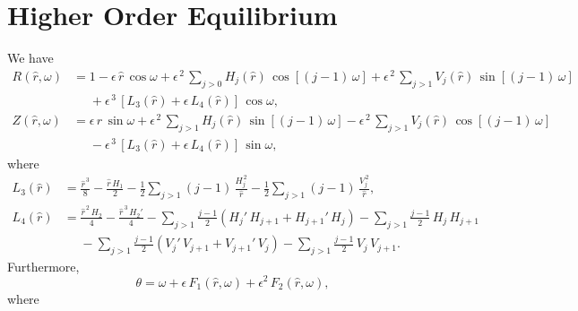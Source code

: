 \documentclass[12pt,prb,aps]{revtex4-1}
\begin{document}
\section{Higher Order Equilibrium}
We have 
\begin{align}
R(\hat{r},\omega) &= 1 -\epsilon\,\hat{r}\,\cos\omega + \epsilon^{\,2}\,\sum_{j>0}H_j(\hat{r})\,\cos[(j-1)\,\omega] + \epsilon^{\,2}\,\sum_{j>1}V_j(\hat{r})\,\sin[(j-1)\,\omega] \nonumber\\[0.5ex]
&\phantom{=}+\epsilon^{\,3}\,[L_3(\hat{r})+\epsilon\,L_4(\hat{r})]\,\cos\omega,\\[0.5ex]
Z(\hat{r},\omega)&= \epsilon\,\hat{r}\,\sin\omega +\epsilon^{\,2}\,\sum_{j>1}H_j(\hat{r})\,\sin[(j-1)\,\omega]
-\epsilon^{\,2}\,\sum_{j>1}V_j(\hat{r})\,\cos[(j-1)\,\omega]\nonumber\\[0.5ex]&\phantom{=}-
\epsilon^{\,3}\,[L_3(\hat{r})+\epsilon\,L_4(\hat{r})]\,\sin\omega,
\end{align}
where
\begin{align}
L_3(\hat{r})&= \frac{\hat{r}^{\,3}}{8} -\frac{\hat{r}\,H_1}{2}-\frac{1}{2}\sum_{j>1}(j-1)\,\frac{H_j^{\,2}}{\hat{r}}
-\frac{1}{2}\sum_{j>1}(j-1)\,\frac{V_j^{\,2}}{\hat{r}},\\[0.5ex]
L_4(\hat{r})&=\frac{\hat{r}^{\,2}\,H_2}{4}  - \frac{\hat{r}^{\,3}\,H_2'}{4}
-\sum_{j>1}\frac{j-1}{2}\left(H_j'\,H_{j+1}+H_{j+1}'\,H_j\right) - \sum_{j>1}\frac{j-1}{2}\,H_j\,H_{j+1}\nonumber\\[0.5ex]
&\phantom{=}-\sum_{j>1}\frac{j-1}{2}\left(V_j'\,V_{j+1}+V_{j+1}'\,V_j\right) - \sum_{j>1}\frac{j-1}{2}\,V_j\,V_{j+1}.
\end{align}
Furthermore,
\begin{equation}
\theta =\omega + \epsilon\,F_1(\hat{r},\omega) + \epsilon^2\,F_2(\hat{r},\omega),
\end{equation}
where
\end{document}
